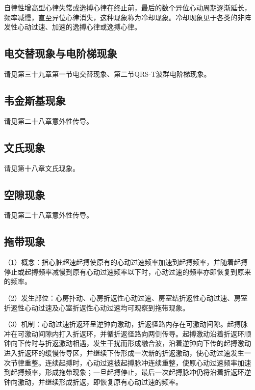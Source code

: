 自律性增高型心律失常或逸搏心律在终止前，最后的数个异位心动周期逐渐延长，频率减慢，直至异位心律消失，这种现象称为冷却现象。冷却现象见于各类的非阵发性心动过速、加速的逸搏心律或逸搏心律。

\protect\hypertarget{text00047.htmlux5cux23subid526}{}{}

\subsection{电交替现象与电阶梯现象}

请见第三十九章第一节电交替现象、第二节QRS-T波群电阶梯现象。

\protect\hypertarget{text00047.htmlux5cux23subid527}{}{}

\subsection{韦金斯基现象}

请见第二十八章意外性传导。

\protect\hypertarget{text00047.htmlux5cux23subid528}{}{}

\subsection{文氏现象}

请见第十八章文氏现象。

\protect\hypertarget{text00047.htmlux5cux23subid529}{}{}

\subsection{空隙现象}

请见第二十八章意外性传导。

\protect\hypertarget{text00047.htmlux5cux23subid530}{}{}

\subsection{拖带现象}

（1）概念：指心脏超速起搏使原有的心动过速频率加速到起搏频率，并随着起搏停止或起搏频率减慢到原有心动过速频率以下时，心动过速的频率亦即恢复到原来的频率。

（2）发生部位：心房扑动、心房折返性心动过速、房室结折返性心动过速、房室折返性心动过速及心室折返性心动过速均可观察到拖带现象。

（3）机制：心动过速折返环呈逆钟向激动，折返径路内存在可激动间隙。起搏脉冲在可激动间隙内打入折返环，并循折返径路向两侧传导。起搏激动沿着折返环顺钟向下传时与折返激动相遇，发生干扰而形成融合波，沿着逆钟向下传的起搏激动进入折返环的缓慢传导区，并继续下传形成一次新的折返激动，使心动过速发生一次节律重整。连续起搏时，心动过速被起搏脉冲连续重整，使原心动过速频率加速到起搏频率，形成拖带现象；一旦起搏停止，最后一次起搏脉冲仍将沿着折返环逆钟向激动，并继续形成折返，即恢复原有心动过速的频率。

